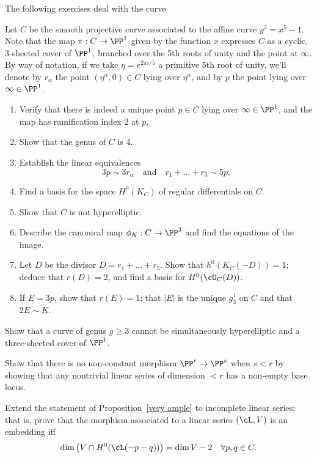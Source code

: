 The following exercises deal with the curve 
\begin{exercise}
Let $C$ be the smooth projective curve associated to the affine curve $y^3 = x^5 -1$. Note that the map $\pi : C \to \PP^1$ given by the function $x$ expresses $C$ as a cyclic, 3-sheeted cover of $\PP^1$, branched over the 5th roots of unity and the point at $\infty$. By way of notation, if we take $\eta = e^{2\pi i/5}$ a primitive 5th root of unity, we'll denote by $r_\alpha$ the point $(\eta^\alpha, 0) \in C$ lying over $\eta^\alpha$, and by $p$ the point lying over $\infty \in \PP^1$.

\begin{enumerate}
\item Verify that there is indeed a unique point $p \in C$ lying over $\infty \in \PP^1$, and the map has ramification index 2 at $p$. 
\item Show that the genus of $C$ is 4.
\item Establish the linear equivalences
$$
3p \sim 3r_\alpha \quad \text{and} \quad r_1+ \dots + r_5 \sim 5p.
$$
\item Find a basis for the space $H^0(K_C)$ of regular differentials on $C$.
\item Show that $C$ is not hyperelliptic.
\item Describe the canonical map $\phi_K : C \to \PP^3$ and find the equations of the image.
\item Let $D$ be the divisor $D = r_1+\dots+r_5$. Show that $h^0(K_C(-D)) = 1$; deduce that $r(D) = 2$, and find a basis for $H^0(\cO_C(D))$.
\item If $E = 3p$, show that $r(E) = 1$; that $|E|$ is the unique $g^1_3$ on $C$ and that $2E \sim K$.
\end{enumerate}
\end{exercise}


\begin{exercise}\label{gonality exclusion}
Show that a curve of genus $g \geq 3$ cannot be simultaneously hyperelliptic and a three-sheeted cover of $\PP^1$.
\end{exercise}


\begin{exercise}\label{here there be basepoints}
 Show that there is no non-constant morphism $\PP^r\to \PP^s$ when $s<r$ by showing that any nontrivial linear
 series of dimension $<r$ has a non-empty base locus.
\end{exercise}

\begin{exercise}
Extend the statement of Proposition~\ref{very ample} to incomplete linear series; that is, prove that the morphism associated to a linear series $(\cL, V)$ is an embedding iff
$$
\dim\big( V \cap H^0(\cL(-p-q))\big) = \dim V - 2 \quad \forall p, q \in C.
$$
\end{exercise}

